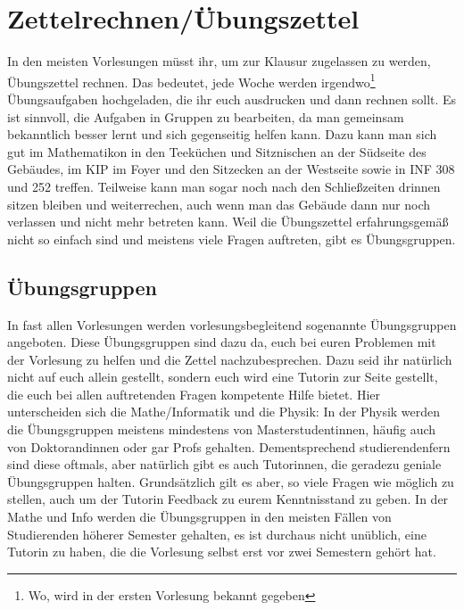 
\section{Zettelrechnen/Übungszettel}
\label{uebungsgruppen}

\noindent In den meisten Vorlesungen müsst ihr, um zur Klausur zugelassen zu werden, Übungszettel rechnen. Das bedeutet, jede Woche werden irgendwo\footnote{Wo, wird in der ersten Vorlesung bekannt gegeben} Übungsaufgaben hochgeladen, die ihr euch ausdrucken und dann rechnen sollt. Es ist sinnvoll, die Aufgaben in Gruppen zu bearbeiten, da man gemeinsam bekanntlich besser lernt und sich gegenseitig helfen kann. Dazu kann man sich gut im Mathematikon in den Teeküchen und Sitznischen an der Südseite des Gebäudes, im \gls{KIP} im Foyer und den Sitzecken an der Westseite sowie in INF 308 und 252 treffen. Teilweise kann man sogar noch nach den Schließzeiten drinnen sitzen bleiben und weiterrechen, auch wenn man das Gebäude dann nur noch verlassen und nicht mehr betreten kann. Weil die Übungszettel erfahrungsgemäß nicht so einfach sind und meistens viele Fragen auftreten, gibt es Übungsgruppen.

\subsection{Übungsgruppen}
In fast allen Vorlesungen werden vorlesungsbegleitend sogenannte Übungsgruppen angeboten. Diese Übungsgruppen sind dazu da, euch bei euren Problemen mit der Vorlesung zu helfen und die Zettel nachzubesprechen. Dazu seid ihr natürlich nicht auf euch allein gestellt, sondern euch wird eine Tutorin zur Seite gestellt, die euch bei allen auftretenden Fragen kompetente Hilfe bietet. Hier unterscheiden sich die Mathe/Informatik und die Physik: In der Physik werden die Übungsgruppen meistens mindestens von Masterstudentinnen, häufig auch von Doktorandinnen oder gar Profs gehalten. Dementsprechend studierendenfern sind diese oftmals, aber natürlich gibt es auch Tutorinnen, die geradezu geniale Übungsgruppen halten. Grundsätzlich gilt es aber, so viele Fragen wie möglich zu stellen, auch um der Tutorin Feedback zu eurem Kenntnisstand zu geben. In der Mathe und Info werden die Übungsgruppen in den meisten Fällen von Studierenden höherer Semester gehalten, es ist durchaus nicht unüblich, eine Tutorin zu haben, die die Vorlesung selbst erst vor zwei Semestern gehört hat.

